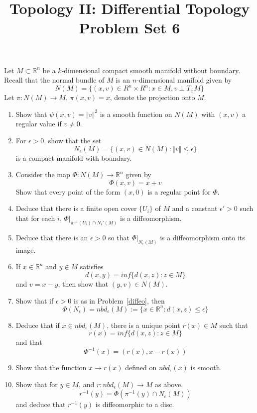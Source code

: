 \documentclass[12pt]{article}
\newcommand{\R}{\mathbb{R}}
\begin{document}
\title{Topology II: Differential Topology\\
Problem Set 6} 
\date{}
\maketitle

\thispagestyle{empty}

Let $M\subset \R^n$ be a $k$-dimensional compact smooth manifold without boundary. Recall that the normal bundle of $M$ is an $n$-dimensional manifold given by
$$N(M)=\{(x,v)\in R^n\times R^n: x\in M, v\perp T_xM\}$$
Let $\pi:N(M)\to M$, $\pi(x,v)=x$, denote the projection onto $M$.

\begin{enumerate}

\item Show that $\psi(x,v)=\Vert v\Vert^2$ is a smooth function on $N(M)$ with $(x,v)$ a regular value if $v\neq 0$.

\item For $\epsilon>0$, show that the set
$$N_\epsilon(M)=\{(x,v)\in N(M): \Vert v \Vert\leq \epsilon\}$$ 
is a compact manifold with boundary.

\item Consider the map $\Phi:N(M)\to \R^n$ given by 
$$\Phi(x,v)=x+v$$
Show that every point of the form $(x,0)$ is a regular point for $\Phi$.

\item Deduce that there is a finite open cover $\{U_i\}$ of $M$ and a constant $\epsilon'>0$ such that for each $i$, $\Phi\vert_{\pi^{-1}(U_i)\cap N_\epsilon'(M)}$ is a diffeomorphism.

\item\label{diffeo} Deduce that there is an $\epsilon>0$ so that $\Phi\vert_{N_\epsilon(M)}$ is a diffeomorphism onto its image.

\item If $x\in \R^n$ and $y\in M$ satisfies 
$$d(x,y)=inf\{d(x,z): z\in M\}$$
and $v=x-y$, then show that $(y,v)\in N(M)$.

\item Show that if $\epsilon>0$ is as in Problem~\ref{diffeo}, then 
$$\Phi(N_\epsilon)=nbd_\epsilon(M):=\{x\in \R^n: d(x,z)\leq\epsilon\}$$

\item Deduce that if $x\in nbd_\epsilon(M)$, there is a unique point $r(x)\in M$ such that 
$$r(x)=inf\{d(x,z): z\in M\}$$
and that 
$$\Phi^{-1}(x)=(r(x),x-r(x))$$

\item Show that the function $x\to r(x)$ defined on $nbd_\epsilon(x)$ is smooth. 

\item Show that for $y\in M$, and $r:nbd_\epsilon(M)\to M$ as above, 
$$r^{-1}(y)=\Phi(\pi^{-1}(y)\cap N_\epsilon(M))$$
and deduce that $r^{-1}(y)$ is diffeomorphic to a disc.
\end{enumerate}
\end{document}
